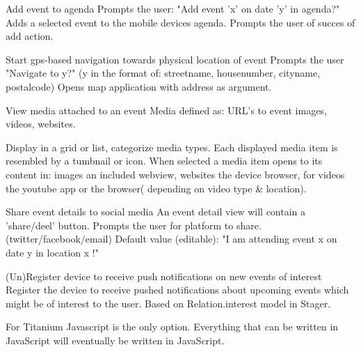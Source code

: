 Add event to agenda
Prompts the user: "Add event 'x' on date 'y' in agenda?"
Adds a selected event to the mobile devices agenda.
Prompts the user of succes of add action.

Start gps-based navigation towards physical location of event
Prompts the user "Navigate to y?" (y in the format of: streetname, housenumber, cityname, postalcode)
Opens map application with address as argument.

View media attached to an event
Media defined as: URL's to event images, videos, websites.

Display in a grid or list, categorize media types.
Each displayed media item is resembled by a tumbnail or icon.
When selected a media item opens to its content in:
images an included webview,
websites the device browser,
for videos the youtube app or the browser( depending on video type \& location).

Share event details to social media
An event detail view will contain a 'share/deel' button.
Prompts the user for platform to share. (twitter/facebook/email)
Default value (editable): "I am attending event x on date y in location x !"

	
(Un)Register device to receive push notifications on new events of interest
Register the device to receive pushed notifications about upcoming events which might be of interest to the user.
Based on Relation.interest model in Stager.






For Titanium Javascript is the only option. Everything that can be written in JavaScript will eventually be written in JavaScript.


